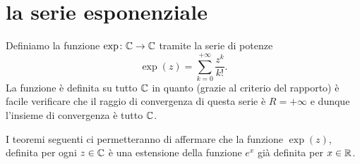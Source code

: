 \section{la serie esponenziale}

Definiamo la funzione $\exp \colon \mathbb C \to \mathbb C$
tramite la serie di potenze
\begin{equation}\label{eq:def_exp}
\exp(z) = \sum_{k=0}^{+\infty} \frac{z^k}{k!}.
\end{equation}
La funzione è definita su tutto $\mathbb C$ in quanto (grazie al criterio del rapporto)
è facile verificare che il raggio di convergenza di questa serie è $R=+\infty$
e dunque l'insieme di convergenza è tutto $\mathbb C$.

I teoremi seguenti ci permetteranno di affermare che la funzione $\exp(z)$,
definita
per ogni $z\in \mathbb C$ è una
estensione della funzione $e^x$ già definita per $x\in \mathbb R$.

